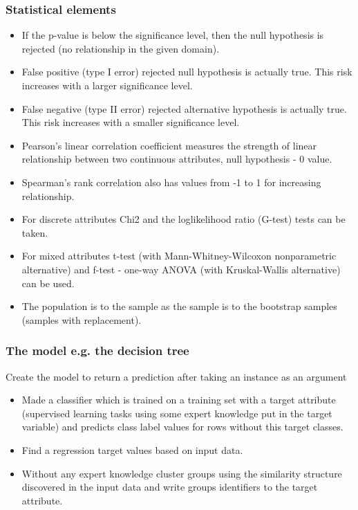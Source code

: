 \documentclass[proffesionalfonts]{beamer}
\begin{document}
\begin{frame}
\footnotesize 
\frametitle{Statistical elements}
\begin{block}{}
\begin{itemize}
\item If the p-value is below the significance level, then the null hypothesis is rejected (no relationship in the given domain).
\item False positive (type I error) rejected null hypothesis is actually true. This risk increases with a larger significance level.
\item False negative (type II error) rejected alternative hypothesis is actually true. This risk increases with a smaller significance level.
\item Pearson's linear correlation coefficient measures the strength of linear relationship between two continuous attributes, null hypothesis - 0 value.
\item Spearman's rank correlation also has values from -1 to 1 for increasing relationship.
\item For discrete attributes Chi2 and the loglikelihood ratio (G-test) tests can be taken.
\item For mixed attributes t-test (with Mann-Whitney-Wilcoxon nonparametric alternative) and f-test - one-way ANOVA (with Kruskal-Wallis alternative) can be used.
\item The population is to the sample as the sample is to the bootstrap samples (samples with replacement).
\end{itemize}
\end{block}
\end{frame}

\begin{frame}
\frametitle{The model e.g. the decision tree}
\begin{block}{Create the model to return a prediction after taking an instance as an argument}
\begin{itemize}
\item Made a classifier which is trained on a training set with a target attribute (supervised learning tasks using some expert knowledge put in the target variable) and predicts class label values for rows without this target classes. 
\item Find a regression target values based on input data.
\item Without any expert knowledge cluster groups using the similarity structure discovered in the input data and write groups identifiers to the target attribute.
\end{itemize}
\end{block}
\end{frame}
\end{document}
